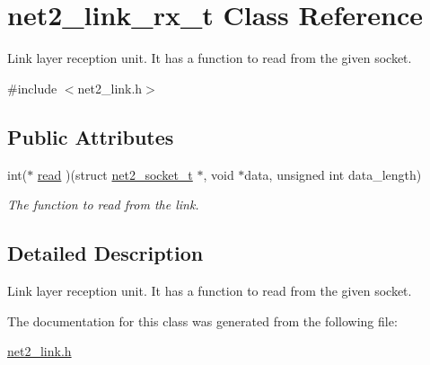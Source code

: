 \hypertarget{structnet2__link__rx__t}{\section{net2\-\_\-link\-\_\-rx\-\_\-t Class Reference}
\label{structnet2__link__rx__t}
}


Link layer reception unit. It has a function to read from the given socket.  




{\ttfamily \#include $<$net2\-\_\-link.\-h$>$}

\subsection*{Public Attributes}
\begin{DoxyCompactItemize}
\item 
\hypertarget{structnet2__link__rx__t_a4cf71287a067a11d18e3e8deb7fd5f9d}{int($\ast$ \hyperlink{structnet2__link__rx__t_a4cf71287a067a11d18e3e8deb7fd5f9d}{read} )(struct \hyperlink{structnet2__socket__t}{net2\-\_\-socket\-\_\-t} $\ast$, void $\ast$data, unsigned int data\-\_\-length)}\label{structnet2__link__rx__t_a4cf71287a067a11d18e3e8deb7fd5f9d}

\begin{DoxyCompactList}\small\item\em The function to read from the link. \end{DoxyCompactList}\end{DoxyCompactItemize}


\subsection{Detailed Description}
Link layer reception unit. It has a function to read from the given socket. 

The documentation for this class was generated from the following file\-:\begin{DoxyCompactItemize}
\item 
\hyperlink{net2__link_8h}{net2\-\_\-link.\-h}\end{DoxyCompactItemize}
